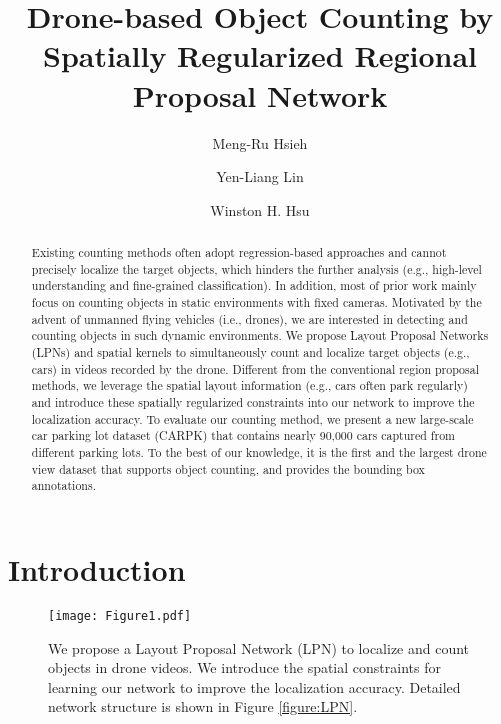 \documentclass[10pt,twocolumn,letterpaper]{article}
\begin{document}
\title{Drone-based Object Counting by Spatially Regularized Regional Proposal Network}

\author[1]{Meng-Ru Hsieh}
\author[2]{Yen-Liang Lin}
\author[1]{Winston H. Hsu}

\maketitle


\begin{abstract}
Existing counting methods often adopt regression-based approaches and cannot precisely localize the target objects, which hinders the further analysis (e.g., high-level understanding and fine-grained classification). In addition, most of prior work mainly focus on counting objects in static environments with fixed cameras. Motivated by the advent of unmanned flying vehicles (i.e., drones), we are interested in detecting and counting objects in such dynamic environments. We propose Layout Proposal Networks (LPNs) and spatial kernels to simultaneously count and localize target objects (e.g., cars) in videos recorded by the drone. Different from the conventional region proposal methods, we leverage the spatial layout information (e.g., cars often park regularly) and introduce these spatially regularized constraints into our network to improve the localization accuracy. To evaluate our counting method, we present a new large-scale car parking lot dataset (CARPK) that contains nearly 90,000 cars captured from different parking lots. To the best of our knowledge, it is the first and the largest drone view dataset that supports object counting, and provides the bounding box annotations.
\end{abstract}

\vspace{-0.5 cm}
\section{Introduction}

\begin{figure}[th]
\begin{center}
   \texttt{[image: Figure1.pdf]}
\end{center}
   \caption{We propose a Layout Proposal Network (LPN) to localize and count objects in drone videos. We introduce the spatial constraints for learning our network to improve the localization accuracy. Detailed network structure is shown in Figure \ref{figure:LPN}.}
\label{figure:Figure1}
\end{figure}
\end{document}
